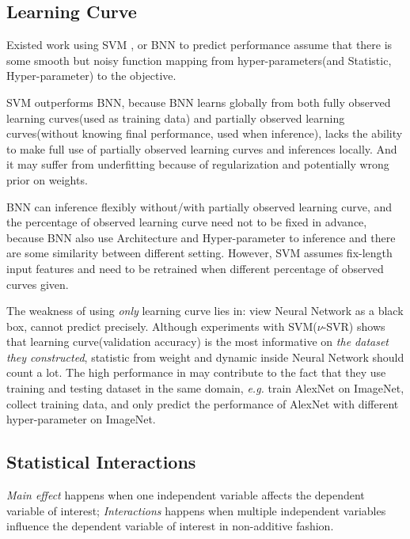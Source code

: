 \documentclass{mcmthesis}
\begin{document}

\subsection{Learning Curve}
Existed work using SVM \cite{klein2016learning}, or BNN \cite{baker2017practical} to predict performance  assume that there is some smooth but noisy function mapping from hyper-parameters(and Statistic,  Hyper-parameter) to the objective. 

SVM outperforms BNN, because BNN learns globally from both  fully observed learning curves(used as training data) and partially observed learning curves(without knowing final performance, used when inference), lacks the ability to make full use of partially observed learning curves  and inferences locally. And it may  suffer from underfitting because of regularization  and potentially wrong prior on weights. 

BNN can inference flexibly without/with partially observed learning curve, and the percentage of observed learning curve need not to be fixed in advance, because BNN also use Architecture and Hyper-parameter to inference and there are some similarity between different setting.  However, SVM assumes fix-length  input features and  need to be retrained when different percentage of observed curves given. 

The weakness of using \textit{only} learning curve lies in: view  Neural Network as a black box, cannot predict precisely. Although experiments with SVM($\nu$-SVR) \cite{baker2017practical} shows that learning curve(validation accuracy) is the most informative on \textit{the dataset they constructed}, statistic from weight and dynamic inside Neural Network should count a lot. The high performance in \cite{baker2017practical} may contribute to the fact that they use training and testing dataset in the same domain, \textit{e.g.} train AlexNet on ImageNet, collect training data, and  only predict  the performance of AlexNet with different hyper-parameter on ImageNet. 

\subsection{Statistical Interactions}
\textit{Main effect} happens when one independent variable affects the dependent variable of interest; \textit{Interactions} happens when multiple independent variables influence the  dependent variable of interest in non-additive fashion. 
\end{document}
